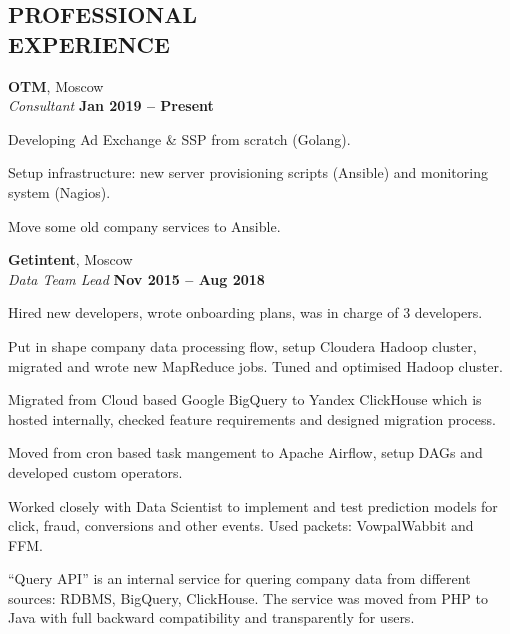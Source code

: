 \documentclass[margin,line]{resume}
\begin{document}
\begin{resume}
    \section{\mysidestyle \textbf{\large{P}\small{ROFESSIONAL\\EXPERIENCE}}}

    \textbf{\listing OTM}, Moscow \vspace{2mm}\\\vspace{1mm}%
    \textsl{Consultant} \hfill \textbf{Jan 2019 – Present}\\
    \begin{list2}
    \item Developing Ad Exchange \& SSP from scratch (Golang).
    \item Setup infrastructure: new server provisioning scripts (Ansible) and monitoring system (Nagios).
    \item Move some old company services to Ansible.
    \end{list2}\vspace{1mm}

    \textbf{\listing Getintent}, Moscow \vspace{2mm}\\\vspace{1mm}%
    \textsl{Data Team Lead} \hfill \textbf{Nov 2015 – Aug 2018}\\
    \begin{list2}
    \item Hired new developers, wrote onboarding plans, was in charge of 3 developers.
    \item Put in shape company data processing flow, setup Cloudera Hadoop cluster, migrated and wrote new MapReduce jobs. Tuned and optimised Hadoop cluster.
    \item Migrated from Cloud based Google BigQuery to Yandex ClickHouse which is hosted internally, checked feature requirements and designed migration process.
    \item Moved from cron based task mangement to Apache Airflow, setup DAGs and developed custom operators.
    \item Worked closely with Data Scientist to implement and test prediction models for click, fraud, conversions and other events. Used packets: VowpalWabbit and FFM.
    \item ``Query API'' is an internal service for quering company data from different sources: RDBMS, BigQuery, ClickHouse. The service was moved from PHP to Java with full backward compatibility and transparently for users. 
    \end{list2}\vspace{1mm}


\end{resume}
\end{document}
